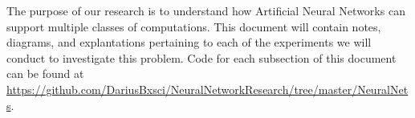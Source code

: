 \documentclass[./Research.tex]{subfiles}
\begin{document}
	The purpose of our research is to understand how Artificial Neural Networks can support multiple classes of computations. This document will contain notes, diagrams, and explantations pertaining to each of the experiments we will conduct to investigate this problem. Code for each subsection of this document can be found at \url{https://github.com/DariusBxsci/NeuralNetworkResearch/tree/master/NeuralNets}. 
\end{document}
